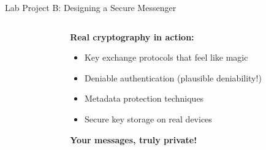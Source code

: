 \documentclass[aspectratio=169, lualatex, handout]{beamer}
\begin{document}
\begin{frame}{Lab Project B: Designing a Secure Messenger}
	\begin{columns}[c]
		\begin{column}{0.5\textwidth}
		\end{column}
		\begin{column}{0.5\textwidth}
			\textbf{Real cryptography in action:}
			\begin{itemize}[<+->]
				\item Key exchange protocols that feel like magic
				\item Deniable authentication (plausible deniability!)
				\item Metadata protection techniques
				\item Secure key storage on real devices
			\end{itemize}
			\vspace{0.5cm}
			\textcolor{cipherprimary}{\textbf{Your messages, truly private!}}
		\end{column}
	\end{columns}
\end{frame}
\end{document}

